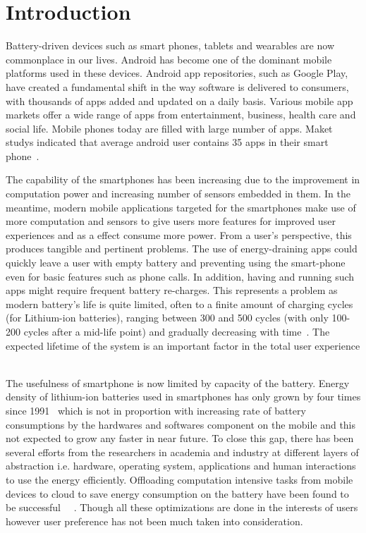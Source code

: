 \section{Introduction}
\label{intro}


Battery-driven devices such as smart phones, tablets and wearables are now commonplace in our lives. Android has become one of the dominant mobile platforms used in these devices. Android app repositories, such as Google Play, have created a fundamental shift in the way software is delivered to consumers, with thousands of apps added and updated on a daily basis. Various mobile app markets offer a wide range of apps from entertainment, business, health care and social life. Mobile phones today are filled with large number of apps. Maket studys indicated that average android user contains 35 apps in their smart phone~\cite{thinkwithgoogle}. 

The capability of the smartphones has been increasing due to the improvement in computation power and increasing number of sensors embedded in them. In the meantime, modern mobile applications targeted for the smartphones make use of more computation and sensors to give users more features for improved user experiences and as a effect consume more power. From a user’s perspective, this produces tangible and pertinent problems. The use of energy-draining apps could quickly leave a user with empty battery and preventing using the smart-phone even for basic features such as phone calls. In addition, having and running such apps might require frequent battery re-charges. This represents a problem as modern battery’s life is quite limited, often to a finite amount of charging cycles (for Lithium-ion batteries), ranging between 300 and 500 cycles (with only 100-200 cycles after a mid-life point) and gradually decreasing with time~\cite{linares2014mining}. The expected lifetime of the system is an important factor in the total user experience ~\cite{kim2013event} ~\cite{li2013energy}

The usefulness of smartphone is now limited by capacity of the battery. Energy density of lithium-ion batteries used in smartphones has only grown by four times since 1991~\cite{janek2016solid} which is not in proportion with increasing rate of battery consumptions by the hardwares and softwares component on the mobile and this not expected to grow any faster in near future. To close this gap, there has been several efforts from the researchers in academia and industry at different  layers of abstraction i.e. hardware, operating system,  applications  and human interactions to use the energy efficiently. Offloading computation intensive tasks from mobile devices to cloud to save energy consumption on the battery have been found to be successful~\cite{lai2017furion} ~\cite{boos2016flashback}. Though all these optimizations are done in the interests of  users however user preference has not been much taken into consideration.
 
